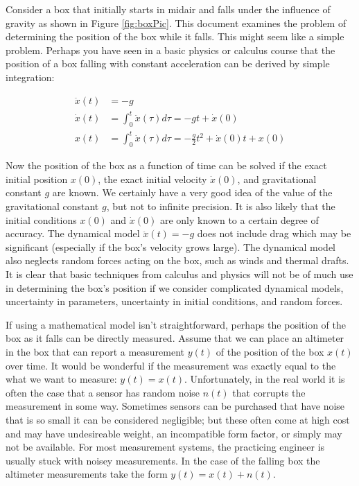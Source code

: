 \documentclass{article}
\begin{document}
Consider a box that initially starts in midair and falls under the influence of gravity as shown in Figure \ref{fig:boxPic}.  This document examines the problem of determining the position of the box while it falls.  This might seem like a simple problem.  Perhaps you have seen in a basic physics or calculus course that the position of a box falling with constant acceleration can be derived by simple integration:

\begin{align}
\label{eq:naiveDynamics}
\ddot{x}(t) &= -g\nonumber\\
\dot{x}(t) 	& =\int_0^t\!\ddot{x}(\tau)d\tau 	= -gt+\dot{x}(0)\nonumber\\
x(t) 		&= \int_0^t\!\dot{x}(\tau)d\tau 	= -\frac{g}{2}t^2+\dot{x}(0)t+x(0)
\end{align}

Now the position of the box as a function of time can be solved if the exact initial position $x(0)$, the exact initial velocity $\dot{x}(0)$, and gravitational constant $g$ are known.  We certainly have a very good idea of the value of the gravitational constant $g$, but not to infinite precision.  It is also likely that the initial conditions $x(0)$ and $\dot{x}(0)$ are only known to a certain degree of accuracy.  The dynamical model $\ddot{x}(t)=-g$ does not include drag which may be significant (especially if the box's velocity grows large).  The dynamical model also neglects random forces acting on the box, such as winds and thermal drafts.  It is clear that basic techniques from calculus and physics will not be of much use in determining the box's position if we consider complicated dynamical models, uncertainty in parameters, uncertainty in initial conditions, and random forces.  

If using a mathematical model isn't straightforward, perhaps the position of the box as it falls can be directly measured.  Assume that we can place an altimeter in the box that can report a measurement $y(t)$ of the position of the box $x(t)$ over time.  It would be wonderful if the measurement was exactly equal to the what we want to measure: $y(t)=x(t)$.  Unfortunately, in the real world it is often the case that a sensor has random noise $n(t)$ that corrupts the measurement in some way.  Sometimes sensors can be purchased that have noise that is so small it can be considered negligible; but these often come at high cost and may have undesireable weight, an incompatible form factor, or simply may not be available.  For most measurement systems, the practicing engineer is usually stuck with noisey measurements.  In the case of the falling box the altimeter measurements take the form $y(t)=x(t)+n(t)$. 
\end{document}
